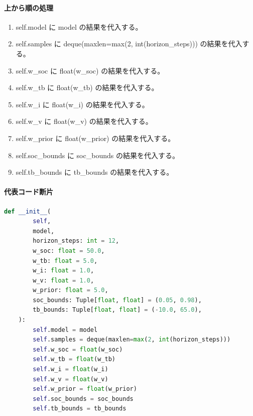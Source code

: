 \documentclass[a4paper,11pt]{article}
\begin{document}
            \paragraph{上から順の処理}
            \begin{enumerate}[leftmargin=1.8em]
            \item self.model に model の結果を代入する。
\item self.samples に deque(maxlen=max(2, int(horizon\_steps))) の結果を代入する。
\item self.w\_soc に float(w\_soc) の結果を代入する。
\item self.w\_tb に float(w\_tb) の結果を代入する。
\item self.w\_i に float(w\_i) の結果を代入する。
\item self.w\_v に float(w\_v) の結果を代入する。
\item self.w\_prior に float(w\_prior) の結果を代入する。
\item self.soc\_bounds に soc\_bounds の結果を代入する。
\item self.tb\_bounds に tb\_bounds の結果を代入する。
            \end{enumerate}
            \paragraph{代表コード断片}
            \begin{lstlisting}[language=Python]
    def __init__(
        self,
        model,
        horizon_steps: int = 12,
        w_soc: float = 50.0,
        w_tb: float = 5.0,
        w_i: float = 1.0,
        w_v: float = 1.0,
        w_prior: float = 5.0,
        soc_bounds: Tuple[float, float] = (0.05, 0.98),
        tb_bounds: Tuple[float, float] = (-10.0, 65.0),
    ):
        self.model = model
        self.samples = deque(maxlen=max(2, int(horizon_steps)))
        self.w_soc = float(w_soc)
        self.w_tb = float(w_tb)
        self.w_i = float(w_i)
        self.w_v = float(w_v)
        self.w_prior = float(w_prior)
        self.soc_bounds = soc_bounds
        self.tb_bounds = tb_bounds
\end{lstlisting}
\end{document}
